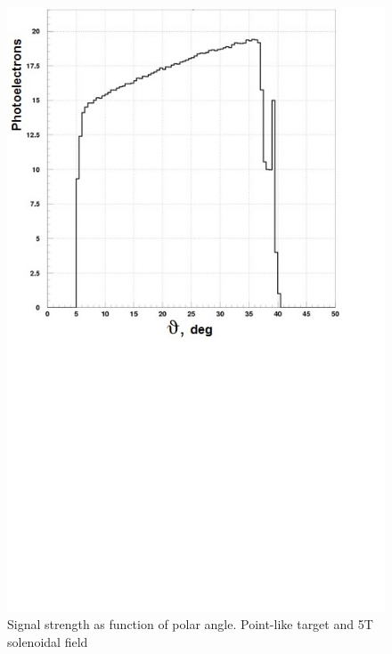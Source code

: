 \begin{figure}[!h]
    \centering
    \includegraphics[width=1.0\linewidth,trim={0.0cm 9.4cm 0.0cm 0.0cm},clip]{images/Point_Targ_5T_Field_Theta.jpg}
    \caption{Signal strength as function of polar angle. Point-like target and 5T solenoidal field}
    \label{fig:Point_Targ_5T_Field_Theta}
\end{figure}

